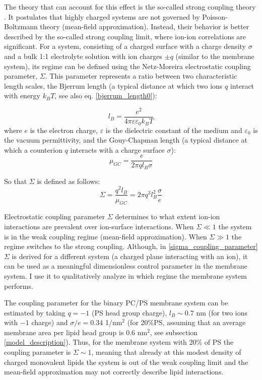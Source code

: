 The theory that can account for this effect is the so-called strong coupling theory \cite{KanduC2010,Naji2005}. It postulates that highly charged systems are not governed by Poisson-Boltzmann theory (mean-field approximation). Instead, their behavior is better described by the so-called strong coupling limit, where ion-ion correlations are significant. For a system, consisting of a charged surface with a charge density $\sigma$ and a bulk 1:1 electrolyte solution with ion charges $\pm q$ (similar to the membrane system), its regime can be defined using the Netz-Moreira electrostatic coupling parameter, $\Sigma$. This parameter represents a ratio between two characteristic length scales, the Bjerrum length (a typical distance at which two ions $q$ interact with energy $k_BT$, see also eq. \eqref{bjerrum_length0}):

\begin{equation}
\label{bjerrum_length}
 l_B=\frac{e^2}{4\pi\varepsilon\varepsilon_0 k_BT}
\end{equation}
where $e$ is the electron charge, $\varepsilon$ is the dielectric constant of the medium and $\varepsilon_0$ is the vacuum permittivity, and the Gouy-Chapman length (a typical distance at which a counterion $q$ interacts with a charge surface $\sigma$):
\begin{equation}
\label{gouy_chapman_length}
 \mu_{GC} = \frac{e}{2\pi q l_B \sigma}
\end{equation}

So that $\Sigma$ is defined as follows:
\begin{equation}
\label{sigma_coupling_parameter}
 \Sigma = \frac{q^2l_B}{\mu_{GC}} = 2\pi q^3 l_B^2\frac{\sigma}{e}
\end{equation}

Electrostatic coupling parameter $\Sigma$ determines to what extent ion-ion interactions are prevalent over ion-surface interactions. When $\Sigma \ll 1$ the system is in the weak coupling regime (mean-field approximation).
When $\Sigma \gg 1$ the regime switches to the strong coupling. Although, in \eqref{sigma_coupling_parameter} $\Sigma$ is derived for a different system (a charged plane interacting with an ion), it can be used as a meaningful dimensionless control parameter in the membrane system. I use it to qualitatively analyze in which regime the membrane system performs.

The coupling parameter for the binary PC/PS membrane system can be estimated by taking $q=-1$ (PS head group charge), $l_B\sim 0.7$ nm (for two ions with $-1$ charge) and $\sigma/e = 0.34$ 1/nm$^2$ (for 20\%PS, assuming that an average membrane area per lipid head group is 0.6 nm$^2$, see subsection \ref{model_description}). Thus, for the membrane system with 20\% of PS the coupling parameter is $\Sigma\sim1$, meaning that already at this modest density of charged monovalent lipids the system is out of the weak coupling limit and the mean-field approximation may not correctly describe lipid interactions.

